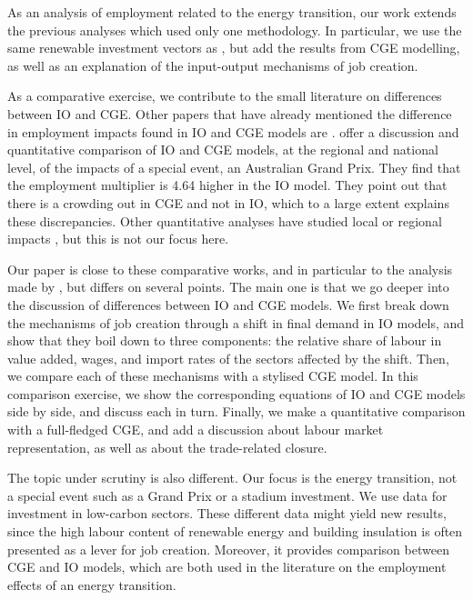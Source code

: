 As an analysis of employment related to the energy transition, our work extends the previous analyses which used only one methodology. In particular, we use the same renewable investment vectors as \citet{Garrett2017}, but add the results from CGE modelling, as well as an explanation of the input-output mechanisms of job creation.

As a comparative exercise, we contribute to the small literature on differences between IO and CGE. 
Other papers that have already mentioned the difference in employment impacts found in IO and CGE models are \citet{Partridge1998, OHara2013}. 
\citet{Dwyer2005} offer a discussion and quantitative comparison of IO and CGE models, at the regional and national level, of the impacts of a special event, an Australian Grand Prix. They find that the employment multiplier is 4.64 higher in the IO model. They point out that there is a crowding out in CGE and not in IO, which to a large extent explains these discrepancies. Other quantitative analyses have studied local or regional impacts \citep{Siegfried2000}, but this is not our focus here. 

Our paper is close to these comparative works, and in particular to the analysis made by \citet{Dwyer2005}, but differs on several points. 
The main one is that we go deeper into the discussion of differences between IO and CGE models. 
We first break down the mechanisms of job creation through a shift in final demand in IO models, and show that they boil down to three components: the relative share of labour in value added, wages, and import rates of the sectors affected by the shift. 
Then, we compare each of these mechanisms with a stylised CGE model. 
In this comparison exercise, we show the corresponding equations of IO and CGE models side by side, and discuss each in turn. Finally, we make a quantitative comparison with a full-fledged CGE, and add a discussion about labour market representation, as well as about the trade-related closure.

The topic under scrutiny is also different. Our focus is the energy transition, not a special event such as a Grand Prix or a stadium investment. We use data for investment in low-carbon sectors. These different data might yield new results, since the high labour content of renewable energy and building insulation is often presented as a lever for job creation. Moreover, it provides comparison between CGE and IO models, which are both used in the literature on the employment effects of an energy transition.

